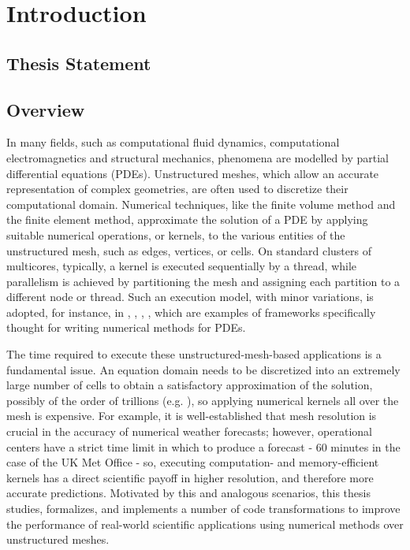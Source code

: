 \chapter{Introduction}

\section{Thesis Statement}

\section{Overview}
In many fields, such as computational fluid dynamics, computational
electromagnetics and structural mechanics, phenomena are modelled by
partial differential equations (PDEs). Unstructured meshes, which
allow an accurate representation of complex geometries, are often used 
to discretize their computational domain. Numerical techniques, like the
finite volume method and the finite element method, approximate the solution 
of a PDE by applying suitable numerical operations, or kernels, to the 
various entities of the unstructured mesh, such as edges, vertices, or
cells. On standard clusters of multicores, typically, a kernel is
executed sequentially by a thread, while parallelism is achieved by
partitioning the mesh and assigning each partition to a different node
or thread. Such an execution model, with minor variations, is adopted,
for instance, in \cite{pyop2isc}, \cite{Fenics}, \cite{fluidity_manual_v4}, \cite{lizst}, which
are examples of frameworks specifically thought for writing numerical methods for PDEs.

The time required to execute these unstructured-mesh-based applications is a fundamental issue.
An equation domain needs to be discretized into an extremely
large number of cells to obtain a satisfactory approximation
of the solution, possibly of the order of trillions
(e.g. \cite{Rossinelli2013}), so applying numerical kernels all over the mesh is expensive. 
For example, it is well-established that mesh resolution is crucial in the accuracy of numerical weather
forecasts; however, operational centers have a strict time
limit in which to produce a forecast - 60 minutes in the case of the
UK Met Office - so, executing computation- and memory-efficient 
kernels has a direct scientific payoff in higher resolution, and 
therefore more accurate predictions. Motivated by this and analogous scenarios, 
this thesis studies, formalizes, and implements a number of
code transformations to improve the performance of real-world scientific 
applications using numerical methods over unstructured meshes. 

